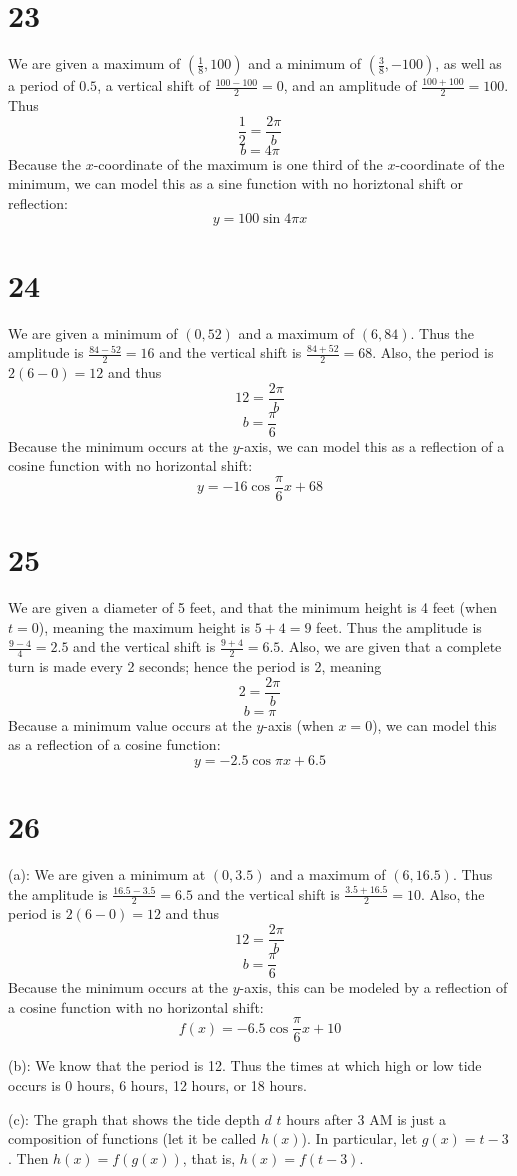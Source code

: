 \documentclass{article}
\theoremstyle{definition}
\newcommand{\?}{\stackrel{?}{=}}
\begin{document}
\section*{23}
We are given a maximum of $(\frac{1}{8},100)$ and a minimum of $(\frac{3}{8},-100)$, as well as a period of $0.5$, a vertical shift of $\frac{100-100}{2}=0$, and an amplitude of
$\frac{100+100}{2}=100$. Thus
\[ \frac{1}{2}=\frac{2\pi}{b} \] \[ b=4\pi \] Because the $x$-coordinate of the maximum is one third of the $x$-coordinate of the minimum, we can model this as a sine function with no horiztonal shift or reflection:
\[ y=100\sin 4\pi x \]

\section*{24}
We are given a minimum of $(0,52)$ and a maximum of $(6,84)$. Thus the amplitude is $\frac{84-52}{2}=16$ and the vertical shift is $\frac{84+52}{2}=68$. Also, the period is
$2(6-0)=12$ and thus \[ 12=\frac{2\pi}{b} \] \[ b=\frac{\pi}{6} \] Because the minimum occurs at the $y$-axis, we can model this as a reflection of a cosine function with no horizontal shift:
\[ y=-16\cos\frac{\pi}{6}x+68 \]

\section*{25}
We are given a diameter of 5 feet, and that the minimum height is 4 feet (when $t=0$), meaning the maximum height is $5+4=9$ feet. Thus the amplitude is 
$\frac{9-4}{4}=2.5$ and the vertical shift is $\frac{9+4}{2}=6.5$. Also, we are given that a complete turn is made every 2 seconds; hence the period is 2, meaning
\[ 2=\frac{2\pi}{b} \] \[ b=\pi \] Because a minimum value occurs at the $y$-axis (when $x=0$), we can model this as a reflection of a cosine function:
\[ y=-2.5\cos\pi x+6.5 \] 

\section*{26}
(a): We are given a minimum at $(0,3.5)$ and a maximum of $(6,16.5)$. Thus the amplitude is $\frac{16.5-3.5}{2}=6.5$ and the vertical shift is $\frac{3.5+16.5}{2}=10$. Also, the period is
$2(6-0)=12$ and thus \[ 12=\frac{2\pi}{b} \] \[ b=\frac{\pi}{6} \] Because the minimum occurs at the $y$-axis, this can be modeled by a reflection of a cosine function with no horizontal shift:
\[ f(x)=-6.5\cos\frac{\pi}{6}x+10 \] 


(b): We know that the period is 12. Thus the times at which high or low tide occurs is 0 hours, 6 hours, 12 hours, or 18 hours.


(c): The graph that shows the tide depth $d$ $t$ hours after 3 AM is just a composition of functions (let it be called $h(x)$). In particular, let $g(x)=t-3$. Then 
$h(x)=f(g(x))$, that is, $h(x)=f(t-3)$.
\end{document}
